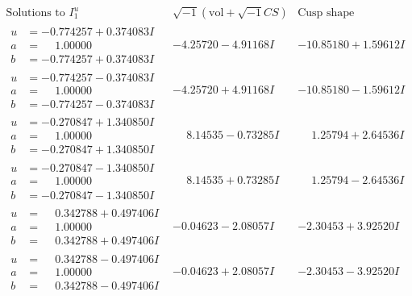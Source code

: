 \documentclass[1p]{elsarticle_modified}
\theoremstyle{definition}
\newcommand{\I}{\sqrt{-1}}
\begin{document}
$$\begin{array}{c|c|c}  
\text{Solutions to }I^u_{1}& \I (\text{vol} + \sqrt{-1}CS) & \text{Cusp shape}\\
 \hline 
\begin{aligned}
u &= -0.774257 + 0.374083 I \\
a &= \phantom{-}1.00000\phantom{ +0.000000I} \\
b &= -0.774257 + 0.374083 I\end{aligned}
 & -4.25720 - 4.91168 I & -10.85180 + 1.59612 I \\ \hline\begin{aligned}
u &= -0.774257 - 0.374083 I \\
a &= \phantom{-}1.00000\phantom{ +0.000000I} \\
b &= -0.774257 - 0.374083 I\end{aligned}
 & -4.25720 + 4.91168 I & -10.85180 - 1.59612 I \\ \hline\begin{aligned}
u &= -0.270847 + 1.340850 I \\
a &= \phantom{-}1.00000\phantom{ +0.000000I} \\
b &= -0.270847 + 1.340850 I\end{aligned}
 & \phantom{-}8.14535 - 0.73285 I & \phantom{-}1.25794 + 2.64536 I \\ \hline\begin{aligned}
u &= -0.270847 - 1.340850 I \\
a &= \phantom{-}1.00000\phantom{ +0.000000I} \\
b &= -0.270847 - 1.340850 I\end{aligned}
 & \phantom{-}8.14535 + 0.73285 I & \phantom{-}1.25794 - 2.64536 I \\ \hline\begin{aligned}
u &= \phantom{-}0.342788 + 0.497406 I \\
a &= \phantom{-}1.00000\phantom{ +0.000000I} \\
b &= \phantom{-}0.342788 + 0.497406 I\end{aligned}
 & -0.04623 - 2.08057 I & -2.30453 + 3.92520 I \\ \hline\begin{aligned}
u &= \phantom{-}0.342788 - 0.497406 I \\
a &= \phantom{-}1.00000\phantom{ +0.000000I} \\
b &= \phantom{-}0.342788 - 0.497406 I\end{aligned}
 & -0.04623 + 2.08057 I & -2.30453 - 3.92520 I \\ \hline\begin{aligned}

\end{aligned}
\end{array}$$
\end{document}
